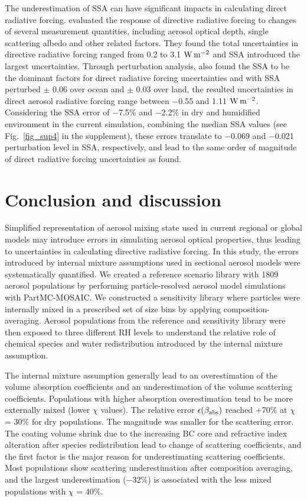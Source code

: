 \documentclass[edeposit,fullpage]{uiucthesis2009}
\makeatletter
\DeclareRobustCommand*\unit[1]
 {\ensuremath{%
   {\thinmuskip3mu\relax
    \def\mu{\text{\textmu}}\def~{\,}%
    \ifx\f@series\testbx\mathbf{#1}\else\mathrm{#1}\fi}}}
\makeatother
\begin{document}
The underestimation of SSA can have significant impacts in calculating
direct radiative forcing.  \citet{mccomiskey2008direct} evaluated the
response of directive radiative forcing to changes of several
measurement quantities, including aerosol optical depth, single
scattering albedo and other related factors. They found the total
uncertainties in directive radiative forcing ranged from 0.2 to 3.1
\unit{W\,m^{-2}} and SSA introduced the largest uncertainties. Through
perturbation analysis, \citet{loeb2010direct} also found the SSA to be
the dominant factors for direct radiative forcing uncertainties and
with SSA perturbed $\pm$ 0.06 over ocean and $\pm$ 0.03 over land, the
resulted uncertainties in direct aerosol radiative forcing range
between $-$0.55 and 1.11 \unit{W\,m^{-2}}. Considering the SSA error of
$-$7.5\% and $-$2.2\% in dry and humidified environment in the current
simulation, combining the median SSA values (see
Fig.~\ref{fig_sup4} in the supplement), these errors
translate to $-$0.069 and $-$0.021 perturbation level in SSA,
respectively, and lead to the same order of magnitude of direct
radiative forcing uncertainties as \citeauthor{loeb2010direct} found.

\section{Conclusion and discussion}
\label{sec:conclusion}

Simplified representation of aerosol mixing state used in current
regional or global models may introduce errors in simulating aerosol
optical properties, thus leading to uncertainties in calculating
directive radiative forcing. In this study, the errors introduced by
internal mixture assumptions used in sectional aerosol models were
systematically quantified. We created a reference scenario library
with 1809 aerosol populations by performing particle-resolved aerosol model
simulations with PartMC-MOSAIC. We constructed a sensitivity library
where particles were internally mixed in a prescribed set of size bins
by applying composition-averaging. Aerosol populations from the
reference and sensitivity library were then exposed to three different
RH levels to understand the relative role of chemical species and
water redistribution introduced by the internal mixture assumption.

The internal mixture assumption generally lead to an overestimation of
the volume absorption coefficients and an underestimation of the
volume scattering coefficients. Populations with higher absorption
overestimation tend to be more externally mixed (lower $\chi$
values). The relative error $\epsilon(\beta_{\rm abs})$ reached +70\%
at $\chi$ = 30\% for dry populations. The magnitude was smaller for
the scattering error. The coating volume shrink due to the increasing
BC core and refractive index alteration after species redistribution 
lead to change of scattering coefficients, and the first factor
is the major reason for underestimating scattering coefficients. Most
populations show scattering underestimation after composition averaging, and
the largest underestimation ($-$32\%) is associated with the less mixed
populations with $\chi$ = 40\%.
\end{document}
